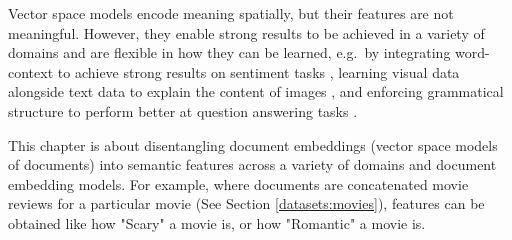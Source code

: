 

%





Vector space models encode meaning spatially, but their features are not meaningful. However, they enable strong results to be achieved in a variety of domains and   are flexible in how they can be learned, e.g.\ by integrating word-context  to achieve strong results on sentiment tasks \cite{Pennington2014}, learning visual data alongside text data to explain the content of images \cite{Mao2014a}, and enforcing grammatical structure to perform better at question answering tasks \cite{Palangi2017}. 



This chapter is about disentangling document embeddings (vector space models of documents) into semantic features across a variety of domains and document embedding models. For example, where documents are concatenated movie reviews for a particular movie (See Section \ref{datasets:movies}), features can be obtained like how "Scary" a movie is, or how "Romantic" a movie is.

